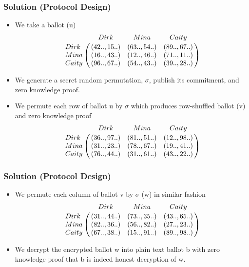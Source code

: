 \documentclass{beamer}
\begin{document}
\begin{frame}
\frametitle{Solution (Protocol Design)}
\begin{itemize}
\item We take a ballot (u)
$$\bordermatrix{\text{}& Dirk & Mina & Caity \cr
                Dirk & (42.., 15..) & (63.., 54..) & (89.., 67..)\cr
                Mina & (16.., 43..) & (12.., 46..) & (71.., 11..)\cr
                Caity & (96.., 67..) & (54.., 43..) & (39.., 28..)}$$ \pause
              
\item We generate a secret random 
	  permutation, $\sigma$, publish its commitment, 
	  and zero knowledge proof. \pause

\item We permute each row of ballot u by $\sigma$ which produces row-shuffled
      ballot (v) and zero knowledge proof 
 $$\bordermatrix{\text{}& Dirk & Mina & Caity \cr
                Dirk & (36.., 97..) & (81.., 51..) & (12.., 98..)\cr
                Mina & (31.., 23..) & (78.., 67..) & (19.., 41..)\cr
                Caity & (76.., 44..) & (31.., 61..) & (43.., 22..)}$$ 
\end{itemize}
\end{frame} 

\begin{frame}
\frametitle{Solution (Protocol Design)}
\begin{itemize}
\item We permute each column of ballot v by $\sigma$ (w) in similar fashion   
 $$\bordermatrix{\text{}& Dirk & Mina & Caity \cr
                Dirk & (31.., 44..) & (73.., 35..) & (43.., 65..)\cr
                Mina & (82.., 36..) & (56.., 82..) & (27.., 23..)\cr
                Caity & (67.., 38..) & (15.., 91..) & (89.., 98..)}$$ 

\item We decrypt the encrypted ballot w into plain text ballot b with 
	  zero knowledge proof that b is indeed honest decryption of w.

\end{itemize}
\end{frame}

%
%
\end{document}
